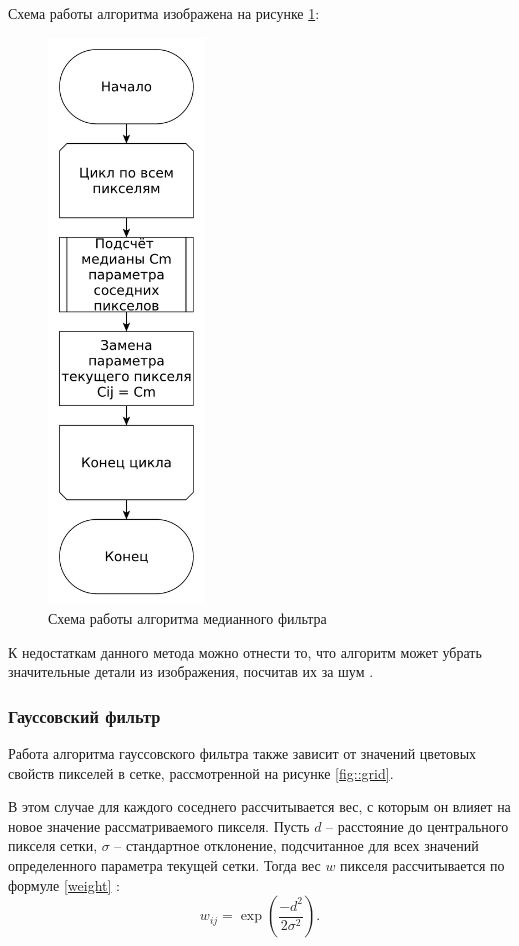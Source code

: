 Схема работы алгоритма изображена на рисунке \ref{fig::median}:
\FloatBarrier
\begin{figure}[h]	
	\begin{center}
		\includegraphics[height=15cm]{inc/pdf/median.pdf}
	\end{center}
	\captionsetup{justification=centering}
	\caption{Схема работы алгоритма медианного фильтра}
	\label{fig::median}
\end{figure}
\FloatBarrier

К недостаткам данного метода можно отнести то, что алгоритм может убрать значительные детали из изображения, посчитав их за шум \cite{median2}. 


\subsubsection{Гауссовский фильтр}
Работа алгоритма гауссовского фильтра также зависит от значений цветовых свойств пикселей в сетке, рассмотренной на рисунке \ref{fig::grid}.

В этом случае для каждого соседнего рассчитывается вес, с которым он влияет на новое значение рассматриваемого пикселя. 
Пусть $d$ -- расстояние до центрального пикселя сетки, $\sigma$ -- стандартное отклонение, подсчитанное для всех значений определенного параметра текущей сетки.
Тогда вес $w$ пикселя рассчитывается по формуле \eqref{weight} \cite{filterTechincs}:
\begin{equation}
	\label{weight}
	w_{ij} = \exp\left(\frac{-d^2}{2\sigma^2}\right).
\end{equation}

